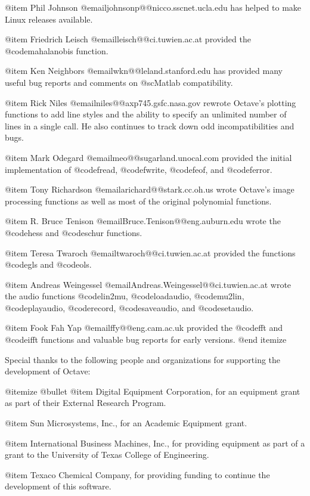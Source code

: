 @item
Phil Johnson @email{johnsonp@@nicco.sscnet.ucla.edu} has helped to make
Linux releases available.

@item
Friedrich Leisch @email{leisch@@ci.tuwien.ac.at} provided the
@code{mahalanobis} function.

@item
Ken Neighbors @email{wkn@@leland.stanford.edu} has provided many useful
bug reports and comments on @sc{Matlab} compatibility.

@item
Rick Niles @email{niles@@axp745.gsfc.nasa.gov} rewrote Octave's plotting
functions to add line styles and the ability to specify an unlimited
number of lines in a single call.  He also continues to track down odd
incompatibilities and bugs.

@item
Mark Odegard @email{meo@@sugarland.unocal.com} provided the initial
implementation of @code{fread}, @code{fwrite}, @code{feof}, and
@code{ferror}.

@item
Tony Richardson @email{arichard@@stark.cc.oh.us} wrote Octave's
image processing functions as well as most of the original polynomial
functions.

@item
R. Bruce Tenison @email{Bruce.Tenison@@eng.auburn.edu} wrote the
@code{hess} and @code{schur} functions.

@item
Teresa Twaroch @email{twaroch@@ci.tuwien.ac.at} provided the functions
@code{gls} and @code{ols}.

@item
Andreas Weingessel @email{Andreas.Weingessel@@ci.tuwien.ac.at} wrote the
audio functions @code{lin2mu}, @code{loadaudio}, @code{mu2lin},
@code{playaudio}, @code{record}, @code{saveaudio}, and @code{setaudio}.

@item
Fook Fah Yap @email{ffy@@eng.cam.ac.uk} provided the @code{fft} and
@code{ifft} functions and valuable bug reports for early versions.
@end itemize

Special thanks to the following people and organizations for
supporting the development of Octave:

@itemize @bullet
@item
Digital Equipment Corporation, for an equipment grant as part of their
External Research Program.

@item
Sun Microsystems, Inc., for an Academic Equipment grant.

@item
International Business Machines, Inc., for providing equipment as part
of a grant to the University of Texas College of Engineering.

@item
Texaco Chemical Company, for providing funding to continue the
development of this software.

